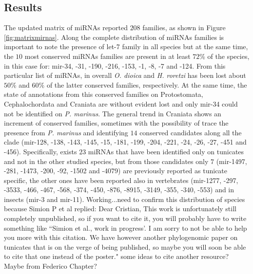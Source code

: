 \documentclass[11pt]{article}
\newcommand{\CAVH}[1]{\begingroup\color{red}#1\endgroup}
\begin{document}
\subsection*{Results}
The updated matrix of miRNAs reported $208$ families, as shown in Figure 
\ref{fig:matrixmirnas}. Along the complete distribution of miRNAs families is 
important to note the presence of let-7 family in all species but at the same 
time, the $10$ most conserved miRNAs families are present in at least $72$\% of 
the species, in this case for: mir-34, -31, -190, -216, -153, -1, -8, -7 and 
-124. From this particular list of miRNAs, in overall \textit{O. dioica} and 
\textit{H. roretzi} has been lost about $50$\% and $60$\% of the latter 
conserved families, respectively. At the same time, the state of annotations 
from this conserved families on Protostomata, Cephalochordata and Craniata are 
without evident lost and only mir-34 could not be identified on \textsl{P. 
marinus}. The general trend in Craniata shows an increment of conserved 
families, sometimes with the possibility of trace the presence from \textit{P. 
marinus} and identifying $14$ conserved candidates along all the clade 
(mir-128, -138, -143, -145, -15, -181, -199, -204, -221, -24, -26, -27, -451 
and -456). Specifically, exists $23$ miRNAs that have been identified only on 
tunicates and not in the other studied species, but from those candidates only 
$7$ (mir-1497, -281, -1473, -200, -92, -1502 and -4079) are previously reported 
as tunicate specific, the other ones have been reported also in vertebrates 
(mir-1277, -297, -3533, -466, -467, -568, -374, -450, -876, -8915, -3149, -355,
-340, -553) and in insects (mir-3 and mir-11). \CAVH{Working...need to confirm
this distribution of species because Simion P et al replied: Dear Cristian, 
This work is unfortunately still completely unpublished, so if you want to cite 
it, you will probably have to write something like ``Simion et al., work in 
progress'. I am sorry to not be able to help you more with this citation. We 
have however another phylogenomic paper on tunicates that is on the verge of 
being published, so maybe you will soon be able to cite that one instead of the 
poster." some ideas to cite another resource? Maybe from Federico Chapter?}
\end{document}
